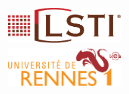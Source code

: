 \begin{figure}[h]
\begin{center}
\hfill
\parbox{3cm}{\includegraphics[width=3cm]{_frontmatter/logos/lsti}}
\end{center}
\vfill
\begin{center}
\parbox{3cm}{\includegraphics[width=3cm]{_frontmatter/logos/uni-rennes1}}
\end{center}
\end{figure}

